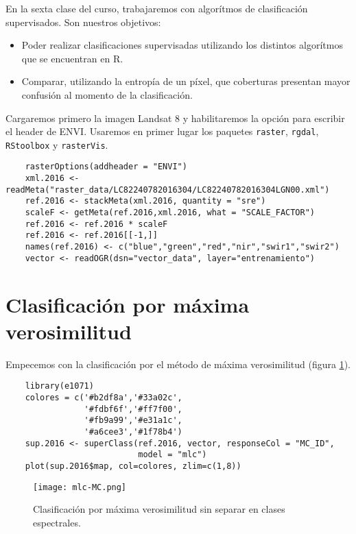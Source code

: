En la sexta clase del curso, trabajaremos con algor\'itmos de clasificaci\'on  supervisados. Son nuestros objetivos:

\begin{itemize}
  \item Poder realizar clasificaciones supervisadas utilizando los distintos algor\'itmos que se encuentran en R.
  \item Comparar, utilizando la entrop\'ia de un p\'ixel, que coberturas presentan  mayor confusi\'on al momento de la clasificaci\'on.
\end{itemize}

Cargaremos primero la imagen Landsat 8 y habilitaremos la opci\'on para escribir el header de ENVI\@. Usaremos en primer lugar los paquetes \texttt{raster}, \texttt{rgdal}, \texttt{RStoolbox} y \texttt{rasterVis}.

\begin{lstlisting}
    rasterOptions(addheader = "ENVI")
    xml.2016 <- readMeta("raster_data/LC82240782016304/LC82240782016304LGN00.xml")
    ref.2016 <- stackMeta(xml.2016, quantity = "sre")
    scaleF <- getMeta(ref.2016,xml.2016, what = "SCALE_FACTOR")
    ref.2016 <- ref.2016 * scaleF
    ref.2016 <- ref.2016[[-1,]]
    names(ref.2016) <- c("blue","green","red","nir","swir1","swir2")
    vector <- readOGR(dsn="vector_data", layer="entrenamiento")
\end{lstlisting}

\section{Clasificaci\'on por m\'axima verosimilitud}

Empecemos con la clasificaci\'on por el m\'etodo de m\'axima verosimilitud (figura \ref{fig:MC}).

\begin{lstlisting}
    library(e1071)
    colores = c('#b2df8a','#33a02c',
                '#fdbf6f','#ff7f00',
                '#fb9a99','#e31a1c',
                '#a6cee3','#1f78b4')
    sup.2016 <- superClass(ref.2016, vector, responseCol = "MC_ID",
                           model = "mlc")
    plot(sup.2016$map, col=colores, zlim=c(1,8))
\end{lstlisting}

\begin{figure}[h!]
  \centering
  \texttt{[image: mlc-MC.png]}
  \caption{Clasificaci\'on por m\'axima verosimilitud sin separar en clases espectrales.}
  \label{fig:MC}
\end{figure}


